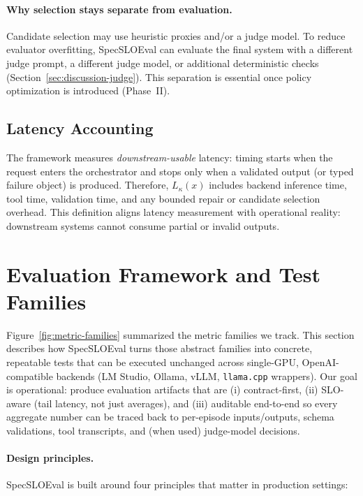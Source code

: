 \documentclass[11pt]{article}
\begin{document}
\paragraph{Why selection stays separate from evaluation.}
Candidate selection may use heuristic proxies and/or a judge model.
To reduce evaluator overfitting, SpecSLOEval can evaluate the final system with a different judge prompt, a different judge model, or additional deterministic checks (Section~\ref{sec:discussion-judge}).
This separation is essential once policy optimization is introduced (Phase~II).

\subsection{Latency Accounting}

The framework measures \emph{downstream-usable} latency: timing starts when the request enters the orchestrator and stops only when a validated output (or typed failure object) is produced.
Therefore, $L_\kappa(x)$ includes backend inference time, tool time, validation time, and any bounded repair or candidate selection overhead.
This definition aligns latency measurement with operational reality: downstream systems cannot consume partial or invalid outputs.

\section{Evaluation Framework and Test Families}
\label{sec:eval-framework}

Figure~\ref{fig:metric-families} summarized the metric families we track.
This section describes how SpecSLOEval turns those abstract families into concrete, repeatable tests that can be executed unchanged across single-GPU, OpenAI-compatible backends (LM Studio, Ollama, vLLM, \texttt{llama.cpp} wrappers).
Our goal is operational: produce evaluation artifacts that are (i) contract-first, (ii) SLO-aware (tail latency, not just averages), and (iii) auditable end-to-end so every aggregate number can be traced back to per-episode inputs/outputs, schema validations, tool transcripts, and (when used) judge-model decisions.

\paragraph{Design principles.}
SpecSLOEval is built around four principles that matter in production settings:
\end{document}
